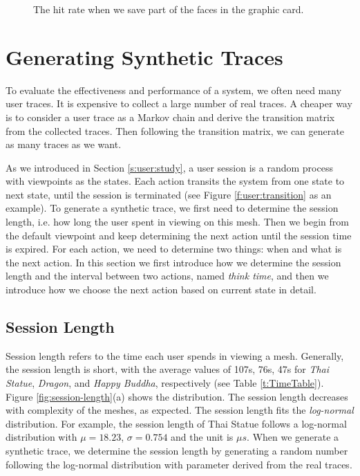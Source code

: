 \begin{figure}[htdp!]
    \centering
\caption{The hit rate when we save part of the faces in the graphic card.\label{fig:face_hit_rate}}
\end{figure}


\section{Generating Synthetic Traces}
\label{s:user:synthetic}
To evaluate the effectiveness and performance of a system, we often need many user traces. 
It is expensive to collect a large number of real traces. 
A cheaper way is to consider a user trace as a Markov chain
and derive the transition matrix from the collected traces.
Then following the transition matrix, we can generate as many traces as we want.

As we introduced in Section \ref{s:user:study}, a user session is a random process 
with viewpoints as the states. Each action transits
the system from one state to next state, until the session is terminated
(see Figure \ref{f:user:transition} as an example). 
To generate a synthetic trace, we first need to determine the session length, i.e. how long
the user spent in viewing on this mesh. Then we begin from the default viewpoint and keep
determining the next action until the session time is expired. For each action, we need 
to determine two things: when and what is the next action. In this section we first introduce
how we determine the session length and the interval between two actions, named \emph{think time},
and then we introduce how we choose the next action based on current state in detail.

\subsection{Session Length}
\label{ss:user:session}
Session length refers to the time each user spends in viewing a mesh. 
Generally, the session length is short, with the average values of 107s, 76s, 47s for \textit{Thai Statue}, 
\textit{Dragon}, and \textit{Happy Buddha}, respectively (see Table \ref{t:TimeTable}). 
Figure \ref{fig:session-length}(a) shows the distribution. 
The session length decreases with complexity of the meshes, as expected. 
The session length fits the \textit{log-normal} distribution.
For example, the session length of Thai Statue follows a log-normal
distribution with $\mu=18.23$, $\sigma = 0.754$ and the unit is ${\mu}s$.
When we generate a synthetic trace, we determine the session length by generating a random number following 
the log-normal distribution with parameter derived from the real traces.

